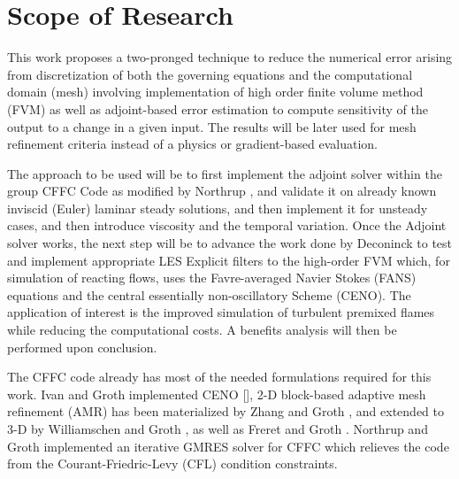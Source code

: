 \section{Scope of Research}
This work proposes a two-pronged technique to reduce the numerical error arising from discretization of both the governing equations and the computational domain (mesh) involving implementation of high order finite volume method (FVM) as well as adjoint-based error estimation to compute sensitivity of the output to a change in a given input. The results will be later used for mesh refinement criteria instead of a physics or gradient-based evaluation. \par

The approach to be used will be to first implement the adjoint solver within the group CFFC Code as modified by Northrup \cite{Northrup:2013}, and validate it on already known inviscid (Euler) laminar steady solutions, and then implement it for unsteady cases, and then introduce viscosity and the temporal variation. Once the Adjoint solver works, the next step will be to advance the work done by Deconinck to test and implement appropriate LES Explicit filters \cite{Deconinck:2008} to the high-order FVM which, for simulation of reacting flows, uses the Favre-averaged Navier Stokes (FANS) equations and the central essentially non-oscillatory Scheme (CENO). The application of interest is the improved simulation of turbulent premixed flames while reducing the computational costs. A benefits analysis will then be performed upon conclusion. \par

The CFFC code already has most of the needed formulations required for this work. Ivan and Groth implemented CENO [\cite{ivan:2007, ivan:2013b}], 2-D block-based adaptive mesh refinement (AMR) has been materialized by Zhang and Groth \cite{zhang:2011b}, and extended to 3-D by Williamschen and Groth \cite{Williamschen:2013}, as well as Freret and Groth \cite{Freret:2015}. Northrup and Groth \cite{Northrup:2013} implemented an iterative GMRES solver for CFFC which relieves the code from the Courant-Friedric-Levy (CFL) condition constraints.\par


